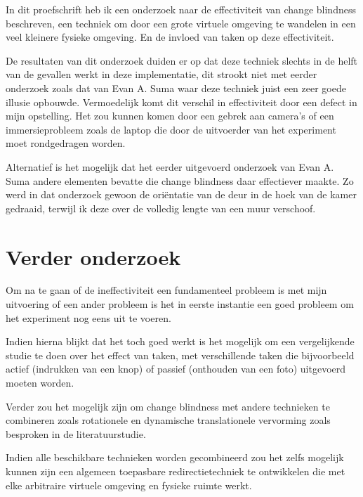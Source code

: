In dit proefschrift heb ik een onderzoek naar de effectiviteit van change
blindness beschreven, een techniek om door een grote virtuele omgeving te
wandelen in een veel kleinere fysieke omgeving. En de invloed van taken op
deze effectiviteit.

De resultaten van dit onderzoek duiden er op dat deze techniek slechts in de
helft van de gevallen werkt in deze implementatie, dit strookt niet met eerder
onderzoek zoals dat van Evan A. Suma \cite{suma11} waar deze techniek juist een 
zeer goede illusie opbouwde. Vermoedelijk komt dit verschil in effectiviteit door 
een defect in mijn opstelling. Het zou kunnen komen door een gebrek aan camera's 
of een immersieprobleem zoals de laptop die door de uitvoerder van het experiment
moet rondgedragen worden.

Alternatief is het mogelijk dat het eerder uitgevoerd onderzoek van Evan A. Suma
\cite{suma11} andere elementen bevatte die change blindness daar effectiever
maakte. Zo werd in dat onderzoek gewoon de ori\"entatie van de deur in de hoek
van de kamer gedraaid, terwijl ik deze over de volledig lengte van een muur
verschoof.


\section{Verder onderzoek}
Om na te gaan of de ineffectiviteit een fundamenteel probleem is met mijn
uitvoering of een ander probleem is het in eerste instantie een goed probleem
om het experiment nog eens uit te voeren.

Indien hierna blijkt dat het toch goed werkt is het mogelijk om een vergelijkende
studie te doen over het effect van taken, met verschillende taken die
bijvoorbeeld actief (indrukken van een knop) of passief (onthouden van een foto)
uitgevoerd moeten worden.

Verder zou het mogelijk zijn om change blindness met andere technieken te
combineren zoals rotationele en dynamische translationele vervorming zoals
besproken in de literatuurstudie.

Indien alle beschikbare technieken worden gecombineerd zou het zelfs mogelijk
kunnen zijn een algemeen toepasbare redirectietechniek te ontwikkelen die met
elke arbitraire virtuele omgeving en fysieke ruimte werkt.